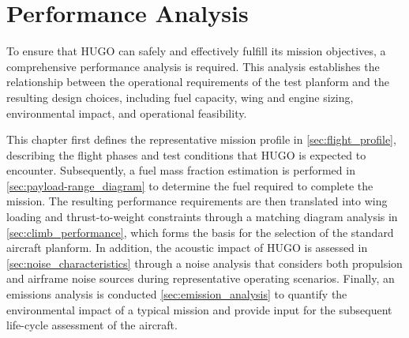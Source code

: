 \chapter{Performance Analysis}
\label{ch:performance_analysis}





To ensure that HUGO can safely and effectively fulfill its mission objectives, a comprehensive performance analysis is required. This analysis establishes the relationship between the operational requirements of the test planform and the resulting design choices, including fuel capacity, wing and engine sizing, environmental impact, and operational feasibility.

This chapter first defines the representative mission profile in \autoref{sec:flight_profile}, describing the flight phases and test conditions that HUGO is expected to encounter. Subsequently, a fuel mass fraction estimation is performed in \autoref{sec:payload-range_diagram} to determine the fuel required to complete the mission. The resulting performance requirements are then translated into wing loading and thrust-to-weight constraints through a matching diagram analysis in \autoref{sec:climb_performance}, which forms the basis for the selection of the standard aircraft planform. In addition, the acoustic impact of HUGO is assessed in \autoref{sec:noise_characteristics} through a noise analysis that considers both propulsion and airframe noise sources during representative operating scenarios. Finally, an emissions analysis is conducted \autoref{sec:emission_analysis} to quantify the environmental impact of a typical mission and provide input for the subsequent life-cycle assessment of the aircraft.




